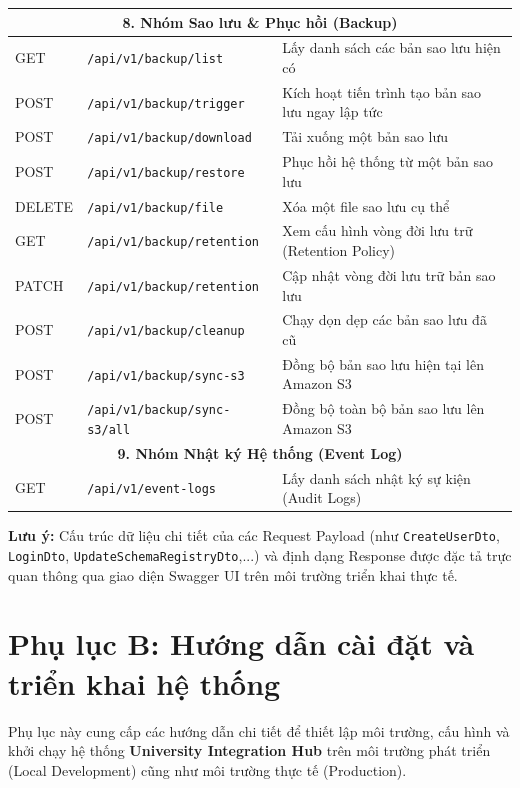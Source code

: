 \begin{longtable}{|p{1.5cm}|p{8cm}|p{5.8cm}|}
\multicolumn{3}{|c|}{\textbf{8. Nhóm Sao lưu \& Phục hồi (Backup)}} \\ \hline
GET & \texttt{/api/v1/backup/list} & Lấy danh sách các bản sao lưu hiện có \\ \hline
POST & \texttt{/api/v1/backup/trigger} & Kích hoạt tiến trình tạo bản sao lưu ngay lập tức \\ \hline
POST & \texttt{/api/v1/backup/download} & Tải xuống một bản sao lưu \\ \hline
POST & \texttt{/api/v1/backup/restore} & Phục hồi hệ thống từ một bản sao lưu \\ \hline
DELETE & \texttt{/api/v1/backup/file} & Xóa một file sao lưu cụ thể \\ \hline
GET & \texttt{/api/v1/backup/retention} & Xem cấu hình vòng đời lưu trữ (Retention Policy) \\ \hline
PATCH & \texttt{/api/v1/backup/retention} & Cập nhật vòng đời lưu trữ bản sao lưu \\ \hline
POST & \texttt{/api/v1/backup/cleanup} & Chạy dọn dẹp các bản sao lưu đã cũ \\ \hline
POST & \texttt{/api/v1/backup/sync-s3} & Đồng bộ bản sao lưu hiện tại lên Amazon S3 \\ \hline
POST & \texttt{/api/v1/backup/sync-s3/all} & Đồng bộ toàn bộ bản sao lưu lên Amazon S3 \\ \hline

\multicolumn{3}{|c|}{\textbf{9. Nhóm Nhật ký Hệ thống (Event Log)}} \\ \hline
GET & \texttt{/api/v1/event-logs} & Lấy danh sách nhật ký sự kiện (Audit Logs) \\ \hline

\end{longtable}

\textbf{Lưu ý:} Cấu trúc dữ liệu chi tiết của các Request Payload (như \texttt{CreateUserDto}, \texttt{LoginDto}, \texttt{UpdateSchemaRegistryDto},...) và định dạng Response được đặc tả trực quan thông qua giao diện Swagger UI trên môi trường triển khai thực tế.

\section*{Phụ lục B: Hướng dẫn cài đặt và triển khai hệ thống}

Phụ lục này cung cấp các hướng dẫn chi tiết để thiết lập môi trường, cấu hình và khởi chạy hệ thống \textbf{University Integration Hub} trên môi trường phát triển (Local Development) cũng như môi trường thực tế (Production).

